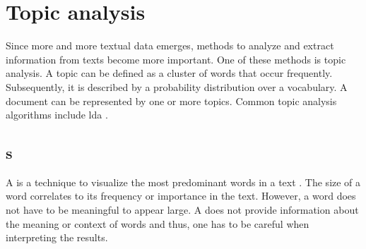 \section{Topic analysis}\label{sec:topic-modeling}

Since more and more textual data emerges, methods to analyze and extract information from texts become more important.
One of these methods is topic analysis.
A topic can be defined as a cluster of words that occur frequently.
Subsequently, it is described by a probability distribution over a vocabulary.
A document can be represented by one or more topics. %
Common topic analysis algorithms include \ac{lda} \cite{topic_modeling2015}.







\subsection{\wordcloud{}s}\label{subsec:word-clouds}

A \wordcloud{} is a technique to visualize the most predominant words in a text \cite{topic_modeling2019}.
The size of a word correlates to its frequency or importance in the text.
However, a word does not have to be meaningful to appear large.
A \wordcloud{} does not provide information about the meaning or context of words and thus, 
one has to be careful when interpreting the results.